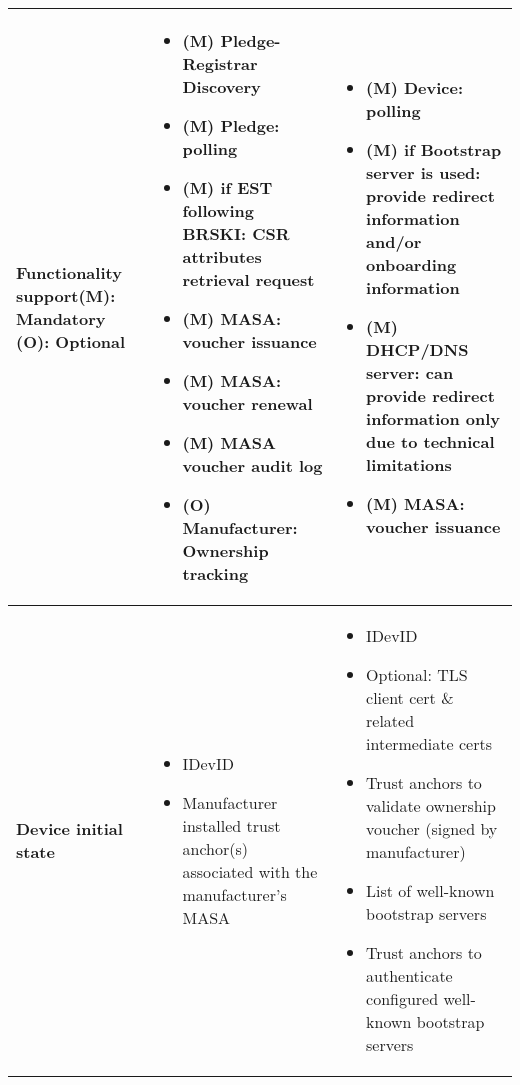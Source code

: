 \begin{landscape}
\begin{longtable}{|p{5cm}|l|l|}
		\hline
		\rowcolor[rgb]{ .745,  .804,  .843}\textbf{Functionality support\newline{}(M): Mandatory\newline{}	(O): Optional} 
			& \multicolumn{1}{p{18.335em}|}{\cellcolor[rgb]{ 1,  1,  1} 
			\begin{itemize}[leftmargin=*,topsep=0pt, noitemsep]
			\item
				(M) Pledge-Registrar Discovery
			\item
				(M) Pledge: polling
			\item
				(M) if EST following BRSKI: CSR attributes retrieval request
			\item
				(M) MASA: voucher issuance
			\item
				(M) MASA: voucher renewal
			\item
				(M) MASA voucher audit log
			\item
				(O) Manufacturer: Ownership tracking
			\end{itemize}
		}
		& \multicolumn{1}{p{18.335em}|}{\cellcolor[rgb]{ 1,  1,  1}
			\begin{itemize}[leftmargin=*, topsep=0pt, noitemsep]
			\item
			(M) Device: polling
			\item
			(M) if Bootstrap server is used: provide redirect information and/or onboarding information
			\item
			(M) DHCP/DNS server: can provide redirect information only due to technical limitations
			\item
			(M) MASA: voucher issuance
			\end{itemize}
		} \bigstrut\\

		\hline
		\rowcolor[rgb]{ .745,  .804,  .843} \textbf{Device initial state} & \multicolumn{1}{p{18.335em}|}{\cellcolor[rgb]{ 1,  1,  1}
			\begin{itemize}[leftmargin=*, topsep=0pt, noitemsep]
			\item
			IDevID
			\item
			Manufacturer installed trust anchor(s) associated with the manufacturer's MASA
			\end{itemize}
		} & \multicolumn{1}{p{18.335em}|}{\cellcolor[rgb]{ 1,  1,  1}
			\begin{itemize}[leftmargin=*, topsep=0pt, noitemsep]
			\item
			 IDevID
			\item
			 Optional:
			 TLS client cert \& related intermediate certs 
			\item
			 Trust anchors to validate ownership voucher (signed by manufacturer)
			\item
			 List of well-known bootstrap servers 
			\item
			 Trust anchors to authenticate configured well-known bootstrap servers
			\end{itemize}
		 } \bigstrut\\


\end{longtable}
\end{landscape}

